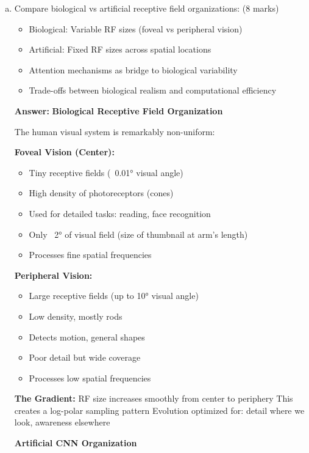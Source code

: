 \documentclass[12pt]{article}
\newcommand{\answer}[1]{{\color{answercolor}\textbf{Answer:} #1}}
\newcommand{\explanation}[1]{{\color{explanationcolor}#1}}
\begin{document}
\begin{enumerate}[(a)]
    \item Compare biological vs artificial receptive field organizations: \hfill (8 marks)
    \begin{itemize}
        \item Biological: Variable RF sizes (foveal vs peripheral vision)
        \item Artificial: Fixed RF sizes across spatial locations
        \item Attention mechanisms as bridge to biological variability
        \item Trade-offs between biological realism and computational efficiency
    \end{itemize}
    
    \answer{
    \textbf{Biological Receptive Field Organization}
    
    \explanation{
    The human visual system is remarkably non-uniform:
    
    \textbf{Foveal Vision (Center):}
    \begin{itemize}
        \item Tiny receptive fields (~0.01° visual angle)
        \item High density of photoreceptors (cones)
        \item Used for detailed tasks: reading, face recognition
        \item Only ~2° of visual field (size of thumbnail at arm's length)
        \item Processes fine spatial frequencies
    \end{itemize}
    
    \textbf{Peripheral Vision:}
    \begin{itemize}
        \item Large receptive fields (up to 10° visual angle)
        \item Low density, mostly rods
        \item Detects motion, general shapes
        \item Poor detail but wide coverage
        \item Processes low spatial frequencies
    \end{itemize}
    
    \textbf{The Gradient:}
    RF size increases smoothly from center to periphery
    This creates a log-polar sampling pattern
    Evolution optimized for: detail where we look, awareness elsewhere
    }
    
    \textbf{Artificial CNN Organization}
    
}
\end{enumerate}
\end{document}
